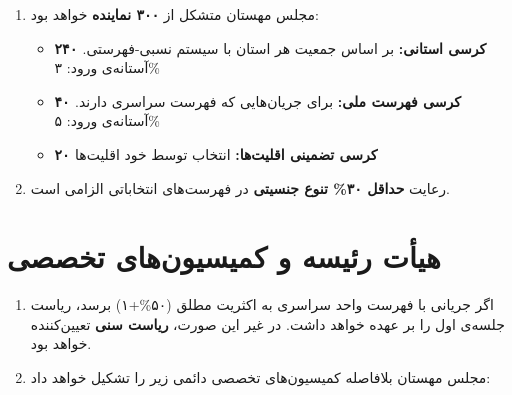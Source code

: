 \documentclass[12pt, a4paper, openright, twoside]{book}
\begin{document}
	\begin{enumerate}[rightmargin=1em, leftmargin=0pt, itemsep=6pt,
		label=\textbf{بند \arabic*.}, start=5]
		
		\item مجلس مهستان متشکل از \textbf{۳۰۰ نماینده} خواهد بود:
		\begin{itemize}[rightmargin=1.5em, leftmargin=0pt, itemsep=3pt]
			\item \textbf{۲۴۰ کرسی استانی:} بر اساس جمعیت هر استان با
			سیستم نسبی-فهرستی. آستانه‌ی ورود: ۳\%
			\item \textbf{۴۰ کرسی فهرست ملی:} برای جریان‌هایی که فهرست
			سراسری دارند. آستانه‌ی ورود: ۵\%
			\item \textbf{۲۰ کرسی تضمینی اقلیت‌ها:} انتخاب توسط خود اقلیت‌ها
		\end{itemize}
		
		\item رعایت \textbf{حداقل ۳۰\% تنوع جنسیتی} در فهرست‌های انتخاباتی
		الزامی است.
	\end{enumerate}
	
	\section{هیأت رئیسه و کمیسیون‌های تخصصی}
	
	\begin{enumerate}[rightmargin=1em, leftmargin=0pt, itemsep=6pt,
		label=\textbf{بند \arabic*.}, start=7]
		
		\item اگر جریانی با فهرست واحد سراسری به اکثریت مطلق (۵۰\%+۱)
		برسد، ریاست جلسه‌ی اول را بر عهده خواهد داشت. در غیر این صورت،
		\textbf{ریاست سنی} تعیین‌کننده خواهد بود.
		
		\item مجلس مهستان بلافاصله کمیسیون‌های تخصصی دائمی زیر را تشکیل
		خواهد داد:
	\end{enumerate}
	
\end{document}
